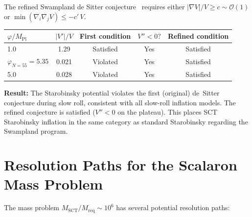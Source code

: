 \documentclass[11pt,a4paper]{article}
\theoremstyle{plain}
\theoremstyle{definition}
\begin{document}
The refined Swampland de Sitter conjecture~\cite{OPSV18} requires either
$|\nabla V|/V \geq c \sim \mathcal{O}(1)$ or
$\min(\nabla_i\nabla_j V) \leq -c'\,V$.

\begin{center}
\begin{tabular}{lcccc}
\toprule
$\varphi/M_{\mathrm{Pl}}$ & $|V'|/V$ & First condition & $V'' < 0?$ & Refined condition \\
\midrule
1.0 & 1.29 & Satisfied & Yes & Satisfied \\
$\varphi_{N=55} = 5.35$ & 0.021 & Violated & Yes & Satisfied \\
5.0 & 0.028 & Violated & Yes & Satisfied \\
\bottomrule
\end{tabular}
\end{center}

\textbf{Result:} The Starobinsky potential violates the first
(original) de~Sitter conjecture during slow roll, consistent with all
slow-roll inflation models.  The refined conjecture is satisfied
($V'' < 0$ on the plateau).  This places SCT Starobinsky inflation in
the same category as standard Starobinsky regarding the Swampland program.

\section{Resolution Paths for the Scalaron Mass Problem}\label{sec:resolution}

The mass problem $M_{\mathrm{SCT}}/M_{\mathrm{req}} \sim 10^6$ has
several potential resolution paths:
\end{document}
